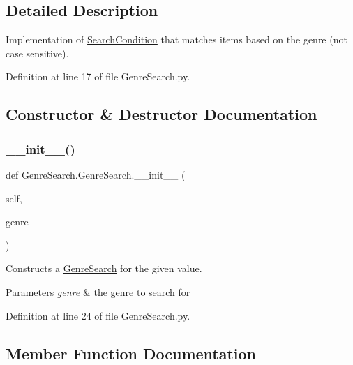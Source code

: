 \subsection{Detailed Description}
Implementation of \hyperlink{namespaceSearchCondition}{Search\+Condition} that matches items based on the genre (not case sensitive). 

Definition at line 17 of file Genre\+Search.\+py.



\subsection{Constructor \& Destructor Documentation}
\mbox{\label{classGenreSearch_1_1GenreSearch_ad098e5ccc44530bafd752eca9b928ea7}} 
\subsubsection{\texorpdfstring{\+\_\+\+\_\+init\+\_\+\+\_\+()}{\_\_init\_\_()}}
{\footnotesize\ttfamily def Genre\+Search.\+Genre\+Search.\+\_\+\+\_\+init\+\_\+\+\_\+ (\begin{DoxyParamCaption}\item[{}]{self,  }\item[{}]{genre }\end{DoxyParamCaption})}



Constructs a \hyperlink{classGenreSearch_1_1GenreSearch}{Genre\+Search} for the given value. 


\begin{DoxyParams}{Parameters}
{\em genre} & the genre to search for \\
\hline
\end{DoxyParams}


Definition at line 24 of file Genre\+Search.\+py.



\subsection{Member Function Documentation}
\mbox{\label{classGenreSearch_1_1GenreSearch_a5804ebb42a3d38e89a4591be173a22d0}} 
